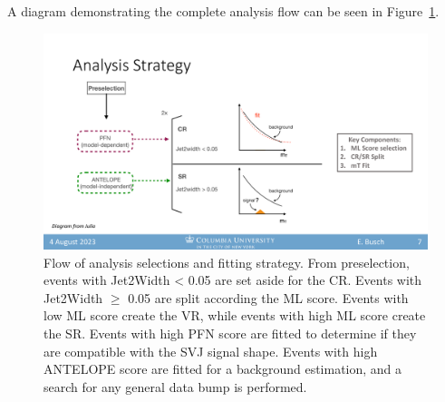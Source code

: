 A diagram demonstrating the complete analysis flow can be seen in Figure~\ref{fig:analysisflow}.
\begin{figure}[!htbp]
\centering
    \includegraphics[width=1.1\textwidth]{figures/eventsel/analysisflow}
    \caption{Flow of analysis selections and fitting strategy. From preselection, events with Jet2Width < 0.05 are set aside for the CR. Events with Jet2Width $\geq$ 0.05 are split according the ML score. Events with low ML score create the VR, while events with high ML score create the SR. Events with high PFN score are fitted to determine if they are compatible with the SVJ signal shape. Events with high ANTELOPE score are fitted for a background estimation, and a search for any general data bump is performed.
    \label{fig:analysisflow}}
\end{figure}


